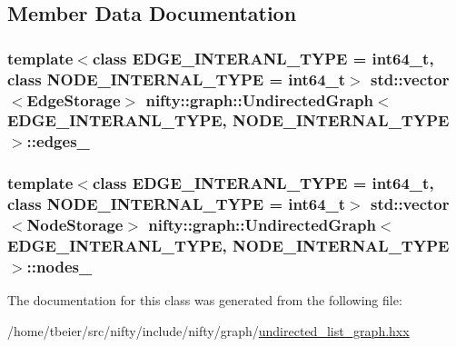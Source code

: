 \subsection{Member Data Documentation}
\hypertarget{classnifty_1_1graph_1_1UndirectedGraph_adc3e4d3dc0f8bff661042af2a05d342f}{}
\subsubsection[{edges\+\_\+}]{\setlength{\rightskip}{0pt plus 5cm}template$<$class E\+D\+G\+E\+\_\+\+I\+N\+T\+E\+R\+A\+N\+L\+\_\+\+T\+Y\+P\+E = int64\+\_\+t, class N\+O\+D\+E\+\_\+\+I\+N\+T\+E\+R\+N\+A\+L\+\_\+\+T\+Y\+P\+E = int64\+\_\+t$>$ std\+::vector$<${\bf Edge\+Storage}$>$ {\bf nifty\+::graph\+::\+Undirected\+Graph}$<$ E\+D\+G\+E\+\_\+\+I\+N\+T\+E\+R\+A\+N\+L\+\_\+\+T\+Y\+P\+E, N\+O\+D\+E\+\_\+\+I\+N\+T\+E\+R\+N\+A\+L\+\_\+\+T\+Y\+P\+E $>$\+::edges\+\_\+\hspace{0.3cm}{\ttfamily [protected]}}\label{classnifty_1_1graph_1_1UndirectedGraph_adc3e4d3dc0f8bff661042af2a05d342f}
\hypertarget{classnifty_1_1graph_1_1UndirectedGraph_a4e12e37bede71b7beaca9fdbc7dd9abc}{}
\subsubsection[{nodes\+\_\+}]{\setlength{\rightskip}{0pt plus 5cm}template$<$class E\+D\+G\+E\+\_\+\+I\+N\+T\+E\+R\+A\+N\+L\+\_\+\+T\+Y\+P\+E = int64\+\_\+t, class N\+O\+D\+E\+\_\+\+I\+N\+T\+E\+R\+N\+A\+L\+\_\+\+T\+Y\+P\+E = int64\+\_\+t$>$ std\+::vector$<${\bf Node\+Storage}$>$ {\bf nifty\+::graph\+::\+Undirected\+Graph}$<$ E\+D\+G\+E\+\_\+\+I\+N\+T\+E\+R\+A\+N\+L\+\_\+\+T\+Y\+P\+E, N\+O\+D\+E\+\_\+\+I\+N\+T\+E\+R\+N\+A\+L\+\_\+\+T\+Y\+P\+E $>$\+::nodes\+\_\+\hspace{0.3cm}{\ttfamily [protected]}}\label{classnifty_1_1graph_1_1UndirectedGraph_a4e12e37bede71b7beaca9fdbc7dd9abc}


The documentation for this class was generated from the following file\+:\begin{DoxyCompactItemize}
\item 
/home/tbeier/src/nifty/include/nifty/graph/\hyperlink{graph_2undirected__list__graph_8hxx}{undirected\+\_\+list\+\_\+graph.\+hxx}\end{DoxyCompactItemize}
